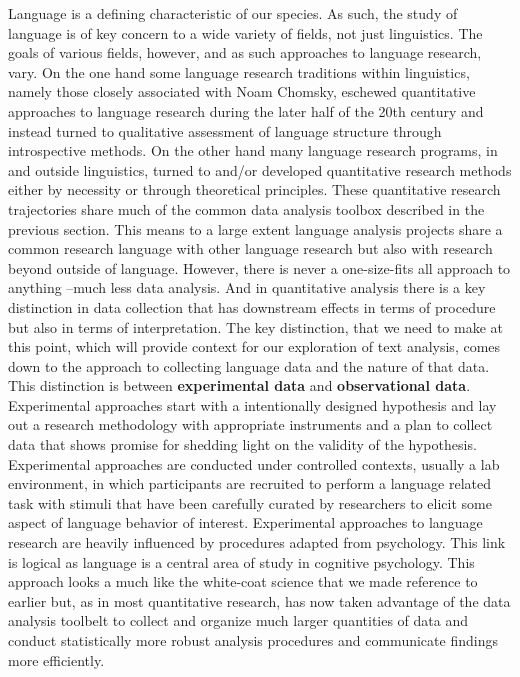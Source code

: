 \documentclass[
  letterpaper,
]{latex/krantz}
\begin{document}
Language is a defining characteristic of our species. As such, the study
of language is of key concern to a wide variety of fields, not just
linguistics. The goals of various fields, however, and as such
approaches to language research, vary. On the one hand some language
research traditions within linguistics, namely those closely associated
with Noam Chomsky, eschewed quantitative approaches to language research
during the later half of the 20th century and instead turned to
qualitative assessment of language structure through introspective
methods. On the other hand many language research programs, in and
outside linguistics, turned to and/or developed quantitative research
methods either by necessity or through theoretical principles. These
quantitative research trajectories share much of the common data
analysis toolbox described in the previous section. This means to a
large extent language analysis projects share a common research language
with other language research but also with research beyond outside of
language. However, there is never a one-size-fits all approach to
anything --much less data analysis. And in quantitative analysis there
is a key distinction in data collection that has downstream effects in
terms of procedure but also in terms of interpretation. The key
distinction, that we need to make at this point, which will provide
context for our exploration of text analysis, comes down to the approach
to collecting language data and the nature of that data. This
distinction is between \textbf{experimental
data} and \textbf{observational
data}. Experimental approaches start with a
intentionally designed hypothesis and lay out a research methodology
with appropriate instruments and a plan to collect data that shows
promise for shedding light on the validity of the hypothesis.
Experimental approaches are conducted under controlled contexts, usually
a lab environment, in which participants are recruited to perform a
language related task with stimuli that have been carefully curated by
researchers to elicit some aspect of language behavior of interest.
Experimental approaches to language research are heavily influenced by
procedures adapted from psychology. This link is logical as language is
a central area of study in cognitive psychology. This approach looks a
much like the white-coat science that we made reference to earlier but,
as in most quantitative research, has now taken advantage of the data
analysis toolbelt to collect and organize much larger quantities of data
and conduct statistically more robust analysis procedures and
communicate findings more efficiently.
\end{document}
